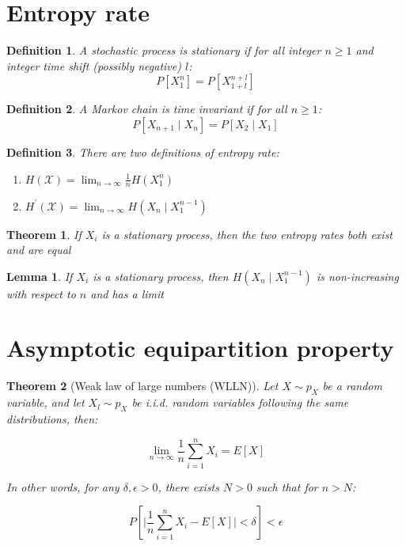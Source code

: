 \documentclass{article}
\newcommand{\norm}[1]{\vert {#1} \vert}
\newtheorem{definition}{Definition}[section]
\newtheorem{theorem}{Theorem}[section]
\newtheorem{lemma}{Lemma}[theorem]
\begin{document}
\section{Entropy rate}
    \begin{definition}
        A stochastic process is stationary if for all integer $n \geq 1$ and integer time shift (possibly negative) $l$:
        \begin{equation*}
            P[X_1^n] = P[X_{1+l}^{n+l}]
        \end{equation*}
    \end{definition}

    \begin{definition}
        A Markov chain is time invariant if for all $n \geq 1$:
        \begin{equation*}
            P[X_{n+1} \mid X_n] = P[X_2 \mid X_1]
        \end{equation*}
    \end{definition}

    \begin{definition}
        There are two definitions of entropy rate:
        \begin{enumerate}
            \item $H(\mathcal{X}) = \lim_{n\rightarrow\infty}\frac{1}{n}H(X_1^n)$
            \item $H^\prime(\mathcal{X}) = \lim_{n\rightarrow\infty}H(X_n\mid X_1^{n-1})$
        \end{enumerate}
    \end{definition}

    \begin{theorem}
        If $X_i$ is a stationary process, then the two entropy rates both exist and are equal
    \end{theorem}
    \begin{lemma}
        If $X_i$ is a stationary process, then $H(X_n \mid X_1^{n-1})$ is non-increasing with respect to $n$ and has a limit
    \end{lemma}

\section{Asymptotic equipartition property}
    \begin{theorem}[Weak law of large numbers (WLLN)]
        Let $X \sim p_X$ be a random variable, and let $X_l \sim p_X$ be i.i.d. random variables following the same distributions, then:

        \begin{equation*}
            \lim_{n \rightarrow \infty}\frac{1}{n}\sum_{i=1}^n X_i = E[X]
        \end{equation*}

        In other words, for any $\delta, \epsilon > 0$, there exists $N > 0$ such that for $n > N$:

        \begin{equation*}
            P[\norm{\frac{1}{n}\sum_{i=1}^n X_i - E[X]} < \delta] < \epsilon
        \end{equation*}
    \end{theorem}
\end{document}

